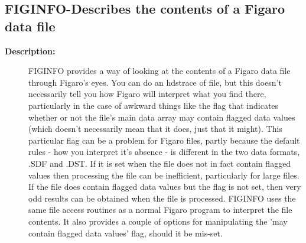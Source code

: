 \subsection{FIGINFO-\label{FIGINFO}Describes the contents of a Figaro data file}
\begin{description}

\item [{\bf Description:}]
 FIGINFO provides a way of looking at the contents of a Figaro data
 file through Figaro's eyes. You can do an hdstrace of file, but this
 doesn't necessarily tell you how Figaro will interpret what you
 find there, particularly in the case of awkward things like the
 flag that indicates whether or not the file's main data array may
 contain flagged data values (which doesn't necessarily mean that it
 does, just that it might). This particular flag can be a problem for
 Figaro files, partly because the default rules - how you interpret
 it's absence - is different in the two data formats, .SDF and .DST.
 If it is set when the file does not in fact contain flagged values then
 processing the file can be inefficient, particularly for large files. If
 the file does contain flagged data values but the flag is not set, then
 very odd results can be obtained when the file is processed. FIGINFO
 uses the same file access routines as a normal Figaro program to
 interpret the file contents. It also provides a couple of options for
 manipulating the 'may contain flagged data values' flag, should it
 be mis-set.


\end{description}
